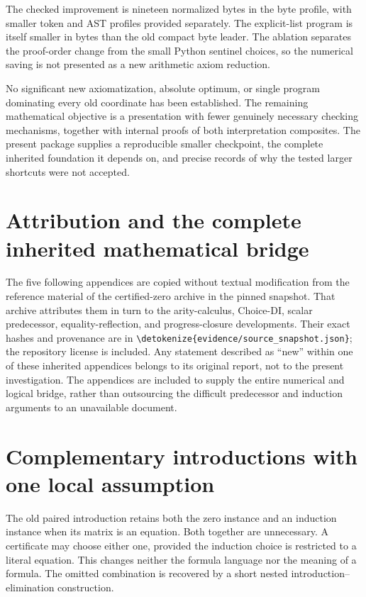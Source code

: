 \documentclass[11pt,letterpaper]{article}
\theoremstyle{definition}\newtheorem{definition}[theorem]{Definition}
\theoremstyle{remark}\newtheorem{remark}[theorem]{Remark}
\newcommand{\file}[1]{\expandafter\nolinkurl\expandafter{\detokenize{#1}}}
\begin{document}
The checked improvement is nineteen normalized bytes in the byte profile,
with smaller token and AST profiles provided separately. The explicit-list
program is itself smaller in bytes than the old compact byte leader.
The ablation separates the proof-order change from the small Python
sentinel choices, so the numerical saving is not presented as a new
arithmetic axiom reduction.

No significant new axiomatization, absolute optimum, or single program
dominating every old coordinate has been established. The remaining
mathematical objective is a presentation with fewer genuinely necessary
checking mechanisms, together with internal proofs of both interpretation
composites. The present package supplies a reproducible smaller checkpoint,
the complete inherited foundation it depends on, and precise records of
why the tested larger shortcuts were not accepted.

\clearpage
\appendix
\section{Attribution and the complete inherited mathematical bridge}
The five following appendices are copied without textual modification
from the reference material of the certified-zero archive in the pinned
snapshot. That archive attributes them in turn to the arity-calculus,
Choice-DI, scalar predecessor, equality-reflection, and progress-closure
developments. Their exact hashes and provenance are in
\file{evidence/source_snapshot.json}; the repository license is included.
Any statement described as ``new'' within one of these inherited
appendices belongs to its original report, not to the present investigation.
The appendices are included to supply the entire numerical and logical
bridge, rather than outsourcing the difficult predecessor and induction
arguments to an unavailable document.


\section{Complementary introductions with one local assumption}
\label{sec:choice-introduction}

The old paired introduction retains both the zero instance and an
induction instance when its matrix is an equation. Both together are
unnecessary. A certificate may choose either one, provided the induction
choice is restricted to a literal equation. This changes neither the
formula language nor the meaning of a formula. The omitted combination
is recovered by a short nested introduction--elimination construction.
\end{document}
